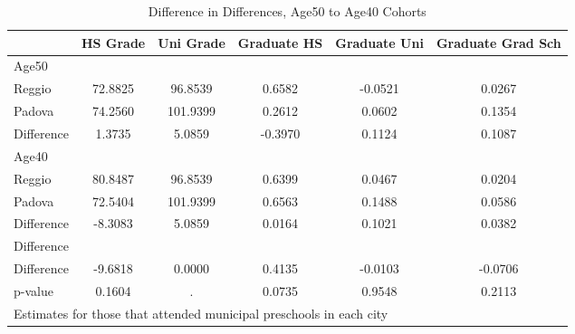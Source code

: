 \begin{table}[htbp]\centering
\caption{Difference in Differences, Age50 to Age40 Cohorts}
\begin{tabular}{l*{5}{c}}
\hline\hline
            &    HS Grade&   Uni Grade& Graduate HS&Graduate Uni&Graduate Grad Sch\\
\hline
Age50       &            &            &            &            &            \\
Reggio      &     72.8825&     96.8539&      0.6582&     -0.0521&      0.0267\\
Padova      &     74.2560&    101.9399&      0.2612&      0.0602&      0.1354\\
Difference  &      1.3735&      5.0859&     -0.3970&      0.1124&      0.1087\\
\hline
Age40       &            &            &            &            &            \\
Reggio      &     80.8487&     96.8539&      0.6399&      0.0467&      0.0204\\
Padova      &     72.5404&    101.9399&      0.6563&      0.1488&      0.0586\\
Difference  &     -8.3083&      5.0859&      0.0164&      0.1021&      0.0382\\
\hline
Difference  &            &            &            &            &            \\
Difference  &     -9.6818&      0.0000&      0.4135&     -0.0103&     -0.0706\\
p-value     &      0.1604&           .&      0.0735&      0.9548&      0.2113\\
\hline\hline
\multicolumn{6}{l}{\footnotesize Estimates for those that attended municipal preschools in each city}\\
\end{tabular}
\end{table}

